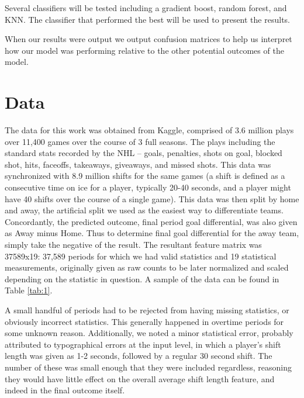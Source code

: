 \documentclass[twocolumn,letterpaper,12pt,notitlepage]{article}
\begin{document}
Several classifiers will be tested including a gradient boost, random forest, and KNN. The classifier that performed the best will be used to present the results.

When our results were output we output confusion matrices to help us interpret how our model was performing relative to the other potential outcomes of the model. 

\section{Data}

The data for this work was obtained from Kaggle, comprised of 3.6 million plays over 11,400 games over
the course of 3 full seasons. The plays including the standard stats recorded by the NHL – goals,
penalties, shots on goal, blocked shot, hits, faceoffs, takeaways, giveaways, and missed shots. This data
was synchronized with 8.9 million shifts for the same games (a shift is defined as a consecutive time on
ice for a player, typically 20-40 seconds, and a player might have 40 shifts over the course of a single
game). This data was then split by home and away, the artificial split we used as the easiest way to
differentiate teams. Concordantly, the predicted outcome, final period goal differential, was also given as
Away minus Home. Thus to determine final goal differential for the away team, simply take the negative
of the result. The resultant feature matrix was 37589x19: 37,589 periods for which we had valid
statistics and 19 statistical measurements, originally given as raw counts to be later normalized and
scaled depending on the statistic in question. A sample of the data can be found in Table \ref{tab:1}. \newline

A small handful of periods had to be rejected from having missing statistics, or obviously incorrect
statistics. This generally happened in overtime periods for some unknown reason. Additionally, we noted
a minor statistical error, probably attributed to typographical errors at the input level, in which a player’s
shift length was given as 1-2 seconds, followed by a regular 30 second shift. The number of these was
small enough that they were included regardless, reasoning they would have little effect on the overall
average shift length feature, and indeed in the final outcome itself.
\end{document}
